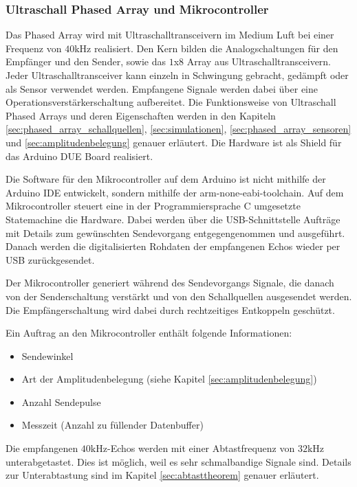 \subsubsection{Ultraschall Phased Array und Mikrocontroller}\label{sec:utraschall_phased_array_und_mikrocontroller}
Das Phased Array wird mit Ultraschalltransceivern im Medium Luft bei einer Frequenz von $40 \mathrm{kHz}$ realisiert. Den Kern bilden die Analogschaltungen für den Empfänger und den Sender, sowie das $1$x$8$ Array aus Ultraschalltransceivern. Jeder Ultraschalltransceiver kann einzeln in Schwingung gebracht, gedämpft oder als Sensor verwendet werden. Empfangene Signale werden dabei über eine Operationsverstärkerschaltung aufbereitet. Die Funktionsweise von Ultraschall Phased Arrays und deren Eigenschaften werden in den Kapiteln \ref{sec:phased_array_schallquellen}, \ref{sec:simulationen}, \ref{sec:phased_array_sensoren} und \ref{sec:amplitudenbelegung} genauer erläutert. Die Hardware ist als Shield für das Arduino DUE Board realisiert.

Die Software für den Mikrocontroller auf dem Arduino ist nicht mithilfe der Arduino IDE entwickelt, sondern mithilfe der arm-none-eabi-toolchain. Auf dem Mikrocontroller steuert eine in der Programmiersprache C umgesetzte Statemachine die Hardware. Dabei werden über die USB-Schnittstelle Aufträge mit Details zum gewünschten Sendevorgang entgegengenommen und ausgeführt. Danach werden die digitalisierten Rohdaten der empfangenen Echos wieder per USB zurückgesendet.

Der Mikrocontroller generiert während des Sendevorgangs Signale, die danach von der Senderschaltung verstärkt und von den Schallquellen ausgesendet werden. Die Empfängerschaltung wird dabei durch rechtzeitiges Entkoppeln geschützt.

\clearpage
Ein Auftrag an den Mikrocontroller enthält folgende Informationen:

\begin{itemize}
	\item Sendewinkel
	\item Art der Amplitudenbelegung (siehe Kapitel \ref{sec:amplitudenbelegung})
	\item Anzahl Sendepulse
	\item Messzeit (Anzahl zu füllender Datenbuffer)
\end{itemize}

Die empfangenen $40 \mathrm{kHz}$-Echos werden mit einer Abtastfrequenz von $32 \mathrm{kHz}$ unterabgetastet. Dies ist möglich, weil es sehr schmalbandige Signale sind. Details zur Unterabtastung sind im Kapitel \ref{sec:abtasttheorem} genauer erläutert.\\

